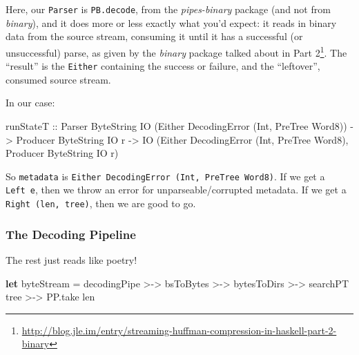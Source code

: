 \documentclass[]{article}
\newenvironment{Shaded}{}{}
\newcommand{\DataTypeTok}[1]{\textcolor[rgb]{0.56,0.13,0.00}{#1}}
\newcommand{\FunctionTok}[1]{\textcolor[rgb]{0.02,0.16,0.49}{#1}}
\newcommand{\KeywordTok}[1]{\textcolor[rgb]{0.00,0.44,0.13}{\textbf{#1}}}
\newcommand{\NormalTok}[1]{#1}
\newcommand{\OtherTok}[1]{\textcolor[rgb]{0.00,0.44,0.13}{#1}}
\renewcommand{\href}[2]{#2\footnote{\url{#1}}}
\begin{document}
Here, our \texttt{Parser} is \texttt{PB.decode}, from the \emph{pipes-binary}
package (and not from \emph{binary}), and it does more or less exactly what
you'd expect: it reads in binary data from the source stream, consuming it until
it has a successful (or unsuccessful) parse, as given by the \emph{binary}
package talked about in
\href{http://blog.jle.im/entry/streaming-huffman-compression-in-haskell-part-2-binary}{Part
2}. The ``result'' is the \texttt{Either} containing the success or failure, and
the ``leftover'', consumed source stream.

In our case:

\begin{Shaded}
\begin{Highlighting}[]
\NormalTok{runStateT}
\OtherTok{  ::} \DataTypeTok{Parser}   \DataTypeTok{ByteString} \DataTypeTok{IO}\NormalTok{ (}\DataTypeTok{Either} \DataTypeTok{DecodingError}\NormalTok{ (}\DataTypeTok{Int}\NormalTok{, }\DataTypeTok{PreTree} \DataTypeTok{Word8}\NormalTok{))}
  \OtherTok{->} \DataTypeTok{Producer} \DataTypeTok{ByteString} \DataTypeTok{IO}\NormalTok{ r}
  \OtherTok{->} \DataTypeTok{IO}\NormalTok{ (}\DataTypeTok{Either} \DataTypeTok{DecodingError}\NormalTok{ (}\DataTypeTok{Int}\NormalTok{, }\DataTypeTok{PreTree} \DataTypeTok{Word8}\NormalTok{), }\DataTypeTok{Producer} \DataTypeTok{ByteString} \DataTypeTok{IO}\NormalTok{ r)}
\end{Highlighting}
\end{Shaded}

So \texttt{metadata} is \texttt{Either\ DecodingError\ (Int,\ PreTree\ Word8)}.
If we get a \texttt{Left\ e}, then we throw an error for unparseable/corrupted
metadata. If we get a \texttt{Right\ (len,\ tree)}, then we are good to go.

\hypertarget{the-decoding-pipeline}{%
\subsubsection{The Decoding Pipeline}\label{the-decoding-pipeline}}

The rest just reads like poetry!

\begin{Shaded}
\begin{Highlighting}[]
\KeywordTok{let}\NormalTok{ byteStream }\FunctionTok{=}\NormalTok{ decodingPipe }\FunctionTok{>->}\NormalTok{ bsToBytes}
             \FunctionTok{>->}\NormalTok{ bytesToDirs  }\FunctionTok{>->}\NormalTok{ searchPT tree}
             \FunctionTok{>->}\NormalTok{ PP.take len}
\end{Highlighting}
\end{Shaded}
\end{document}
